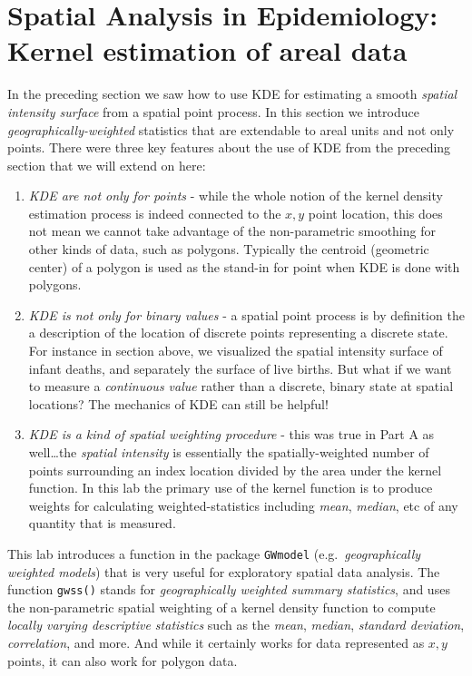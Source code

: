 \documentclass[
]{book}
\newcommand{\passthrough}[1]{#1}
\providecommand{\tightlist}{%
  \setlength{\itemsep}{0pt}\setlength{\parskip}{0pt}}
\begin{document}
\hypertarget{gwss}{%
\section{Spatial Analysis in Epidemiology: Kernel estimation of areal data}\label{gwss}}

In the preceding section we saw how to use KDE for estimating a smooth \emph{spatial intensity surface} from a spatial point process. In this section we introduce \emph{geographically-weighted} statistics that are extendable to areal units and not only points. There were three key features about the use of KDE from the preceding section that we will extend on here:

\begin{enumerate}
\def\labelenumi{\arabic{enumi}.}
\tightlist
\item
  \emph{KDE are not only for points} - while the whole notion of the kernel density estimation process is indeed connected to the \(x,y\) point location, this does not mean we cannot take advantage of the non-parametric smoothing for other kinds of data, such as polygons. Typically the centroid (geometric center) of a polygon is used as the stand-in for point when KDE is done with polygons.
\item
  \emph{KDE is not only for binary values} - a spatial point process is by definition the a description of the location of discrete points representing a discrete state. For instance in section above, we visualized the spatial intensity surface of infant deaths, and separately the surface of live births. But what if we want to measure a \emph{continuous value} rather than a discrete, binary state at spatial locations? The mechanics of KDE can still be helpful!
\item
  \emph{KDE is a kind of spatial weighting procedure} - this was true in Part A as well\ldots the \emph{spatial intensity} is essentially the spatially-weighted number of points surrounding an index location divided by the area under the kernel function. In this lab the primary use of the kernel function is to produce weights for calculating weighted-statistics including \emph{mean}, \emph{median}, etc of any quantity that is measured.
\end{enumerate}

This lab introduces a function in the package \passthrough{\lstinline!GWmodel!} (e.g.~\emph{geographically weighted models}) that is very useful for exploratory spatial data analysis. The function \passthrough{\lstinline!gwss()!} stands for \emph{geographically weighted summary statistics}, and uses the non-parametric spatial weighting of a kernel density function to compute \emph{locally varying descriptive statistics} such as the \emph{mean}, \emph{median}, \emph{standard deviation}, \emph{correlation}, and more. And while it certainly works for data represented as \(x,y\) points, it can also work for polygon data.
\end{document}
